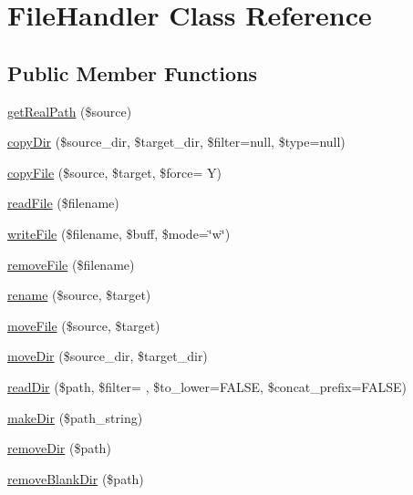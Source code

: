 \hypertarget{classFileHandler}{}\section{File\+Handler Class Reference}
\label{classFileHandler}
\subsection*{Public Member Functions}
\begin{DoxyCompactItemize}
\item 
\hyperlink{classFileHandler_a6370b3eeddb705be04d9f60902a746e0}{get\+Real\+Path} (\$source)
\item 
\hyperlink{classFileHandler_a01289213af2a57f07018e7a84c8b9e87}{copy\+Dir} (\$source\+\_\+dir, \$target\+\_\+dir, \$filter=null, \$type=null)
\item 
\hyperlink{classFileHandler_a60d38b90a939a687ca5fde243936ff79}{copy\+File} (\$source, \$target, \$force= \textquotesingle{}Y\textquotesingle{})
\item 
\hyperlink{classFileHandler_ac0bd2431461ad2bc04c093bfbb826bea}{read\+File} (\$filename)
\item 
\hyperlink{classFileHandler_ad90c10a81460f437bc68952427606155}{write\+File} (\$filename, \$buff, \$mode=\char`\"{}w\char`\"{})
\item 
\hyperlink{classFileHandler_aa5969f9fe0ce869fc736c4da384959e9}{remove\+File} (\$filename)
\item 
\hyperlink{classFileHandler_abfeaad5fe3c937fdbfed73f2138b3d48}{rename} (\$source, \$target)
\item 
\hyperlink{classFileHandler_aa558697af5a900f8594e1013f8d8b2c8}{move\+File} (\$source, \$target)
\item 
\hyperlink{classFileHandler_acb0c863aeb4f29a5ee89eb8f47d576ca}{move\+Dir} (\$source\+\_\+dir, \$target\+\_\+dir)
\item 
\hyperlink{classFileHandler_a02d0cada88becf977968d961df2f864b}{read\+Dir} (\$path, \$filter= \textquotesingle{}\textquotesingle{}, \$to\+\_\+lower=F\+A\+L\+S\+E, \$concat\+\_\+prefix=F\+A\+L\+S\+E)
\item 
\hyperlink{classFileHandler_a9c2502d10c34a3996f1d6927624a7824}{make\+Dir} (\$path\+\_\+string)
\item 
\hyperlink{classFileHandler_a55015d030d3773d96281b0fa4bda986e}{remove\+Dir} (\$path)
\item 
\hyperlink{classFileHandler_a538bfd50008250786985c7da4ff768f1}{remove\+Blank\+Dir} (\$path)

\end{DoxyCompactItemize}
